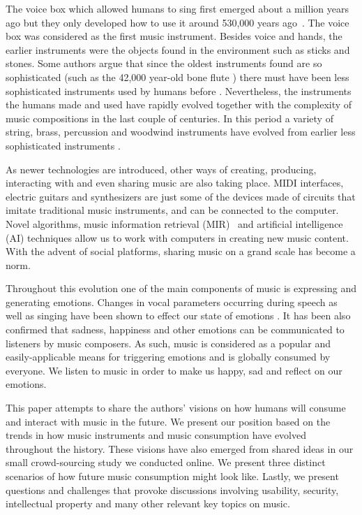 \documentclass[sigchi]{acmart}
\begin{document}
The voice box which allowed humans to sing first emerged about a million years \cite{montagu2017music} ago but they only developed how to use it around 530,000 years ago~\cite{morley2013prehistory}. The voice box was considered as the first music instrument. Besides voice and hands, the earlier instruments were the objects found in the environment such as sticks and stones. Some authors argue that since the oldest instruments found are so sophisticated (such as the 42,000 year-old bone flute \cite{higham2012tauesting,wallin2001origins,conard2009new}) there must have been less sophisticated instruments used by humans before \cite{conard2009new,morley2013prehistory}. Nevertheless, the instruments the humans made and used have rapidly evolved together with the complexity of music compositions in the last couple of centuries. In this period a variety of string, brass, percussion and woodwind instruments have evolved from earlier less sophisticated instruments \cite{conard2009female}.

As newer technologies are introduced, other ways of creating, producing, interacting with and even sharing music \cite{voida2005listening} are also taking place. MIDI interfaces, electric guitars and synthesizers are just some of the devices made of circuits that imitate traditional music instruments, and can be connected to the computer. Novel algorithms, music information retrieval (MIR)~\cite{downie2008music,downie2003music} and artificial intelligence (AI) techniques allow us to work with computers in creating new music content. With the advent of social platforms, sharing music on a grand scale has become a norm.

Throughout this evolution one of the main components of music is expressing and generating emotions. Changes in vocal parameters occurring during speech as well as singing have been shown to effect our state of emotions \cite{kappert2019aim}. It has been also confirmed that sadness, happiness and other emotions can be communicated to listeners by music composers. As such, music is considered as a popular and easily-applicable means for triggering emotions \cite{kappert2019aim} and is globally consumed by everyone. We listen to music in order to make us happy, sad and  reflect on our emotions. 

This paper attempts to share the authors' visions on how humans will consume and interact with music in the future. We present our position based on the trends in how music instruments and music consumption have evolved throughout the history. These visions have also emerged from shared ideas in our small crowd-sourcing study we conducted online. We present three distinct scenarios of how future music consumption might look like. Lastly, we present questions and challenges that provoke discussions involving usability, security, intellectual property and many other relevant key topics on music. 
\end{document}
